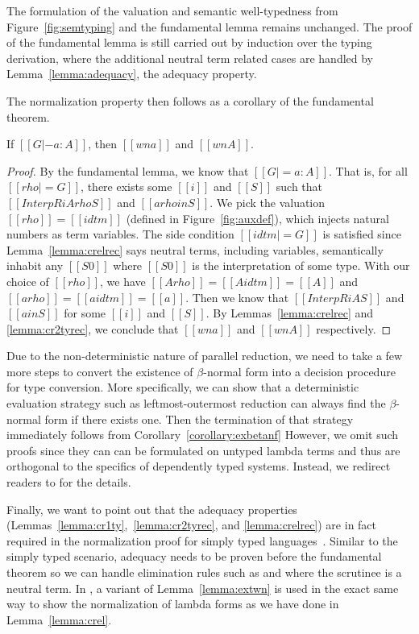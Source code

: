 \documentclass[acmsmall,screen=true,
\ifpublic review=false\else,review=true\fi
  ,anonymous=\ifanonymous true\else false\fi]{acmart}
\newcommand{\scw}[1]{}
\begin{document}
The formulation of the valuation and semantic well-typedness from
Figure~\ref{fig:semtyping} and the fundamental lemma remains
unchanged.
The proof of the fundamental lemma is still carried out by induction
over the typing derivation, where the additional neutral term related
cases are handled by Lemma~\ref{lemma:adequacy}, the adequacy property.

The normalization property then follows as a corollary of the
fundamental theorem.
\begin{corollary}
  \label{corollary:exbetanf}
  If $[[G |- a : A]]$, then $[[wn a]]$ and $[[wn A]]$.
\end{corollary}
\begin{proof}
  By the fundamental lemma, we know that $[[G |= a : A]]$. That is,
  for all $[[rho |= G]]$, there exists some $[[i]]$ and $[[S]]$ such
  that $[[InterpR i A {rho} S]]$ and $[[a {rho} in S]]$.
  We pick the valuation $[[rho]] = [[idtm]]$ (defined in Figure~\ref{fig:auxdef}), which injects
  natural numbers as term variables. The side condition $[[idtm |=
  G]]$ is satisfied since Lemma~\ref{lemma:crelrec} says neutral terms,
  including variables, semantically inhabit any $[[S0]]$ where
  $[[S0]]$ is the interpretation of some type. With our choice of
  $[[rho]]$, we have $[[A {rho}]] = [[A {idtm}]] = [[A]]$ and $[[a {rho}]] = [[a{idtm}]] = [[a]]$. Then we
  know that $[[InterpR i A S]]$ and $[[a in S]]$ for some $[[i]]$ and
  $[[S]]$. By Lemmas~\ref{lemma:crelrec} and \ref{lemma:cr2tyrec}, we
  conclude that $[[wn a]]$ and $[[wn A]]$ respectively.
\end{proof}

Due to the non-deterministic nature of parallel reduction, we need to take a
few more steps to convert the existence of $\beta$-normal form into a decision
procedure for type conversion. More specifically, we can show that a
deterministic evaluation strategy such as leftmost-outermost reduction can
always find the $\beta$-normal form if there exists one. Then the termination
of that strategy immediately follows from Corollary~\ref{corollary:exbetanf}
However, we omit such proofs since they can can be formulated on untyped
lambda terms and thus are orthogonal to the specifics of dependently typed
systems. Instead, we redirect readers to \citet{factorization-essentially,
  takahashi-parallel-reduction} for the details.

\scw{Name and foreshadow these lemmas when they are introduced so that
it is easier to refer to them in the discussion.}
Finally, we want to point out that
the adequacy properties (Lemmas~\ref{lemma:cr1ty},~\ref{lemma:cr2tyrec}, and
\ref{lemma:crelrec}) are in fact required in the normalization proof
for simply typed languages~\citep{abel2019poplmark}. Similar to the
simply typed scenario, adequacy needs to be proven before the
fundamental theorem so we can handle elimination rules such as
 and  where the scrutinee is a neutral term. In
\citet{abel2019poplmark}, a variant of Lemma~\ref{lemma:extwn} is used
in the exact same way to show the normalization of lambda forms
as we have done in Lemma~\ref{lemma:crel}.
\end{document}
